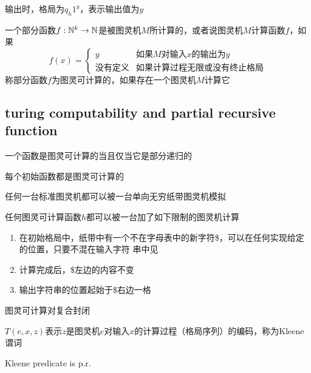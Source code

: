 \documentclass[11pt]{article}
\begin{document}
输出时，格局为\(q_h1^y\)，表示输出值为\(y\)

\begin{definition}[]
一个部分函数\(f:\mathbb{N}^k\to\mathbb{N}\)是被图灵机\(M\)所计算的，或者说图灵机\(M\)计算函数\(f\)，如果
\begin{equation*}
f(x)=
\begin{cases}
y&\text{如果$M$对输入\(x\)的输出为\(y\)}\\
\text{没有定义}&\text{如果计算过程无限或没有终止格局}
\end{cases}
\end{equation*}
称部分函数\(f\)为图灵可计算的，如果存在一个图灵机\(M\)计算它
\end{definition}
\subsection{turing computability and partial recursive function}
\label{sec:org3a10e46}
\begin{theorem}[]
一个函数是图灵可计算的当且仅当它是部分递归的
\end{theorem}

\begin{lemma}[]
每个初始函数都是图灵可计算的
\end{lemma}

\begin{lemma}[]
任何一台标准图灵机都可以被一台单向无穷纸带图灵机模拟
\end{lemma}

\begin{corollary}[]
任何图灵可计算函数\(h\)都可以被一台加了如下限制的图灵机计算
\begin{enumerate}
\item 在初始格局中，纸带中有一个不在字母表中的新字符\$，可以在任何实现给定的位置，只要不混在输入字符
串中见
\item 计算完成后，\$左边的内容不变
\item 输出字符串的位置起始于\$右边一格
\end{enumerate}
\end{corollary}

\begin{lemma}[]
图灵可计算对复合封闭
\end{lemma}

\begin{definition}[]
\(T(e,x,z)\)表示\(z\)是图灵机\(e\)对输入\(x\)的计算过程（格局序列）的编码，称为Kleene谓词
\end{definition}

\begin{lemma}[]
Kleene predicate is p.r.
\end{lemma}
\end{document}
